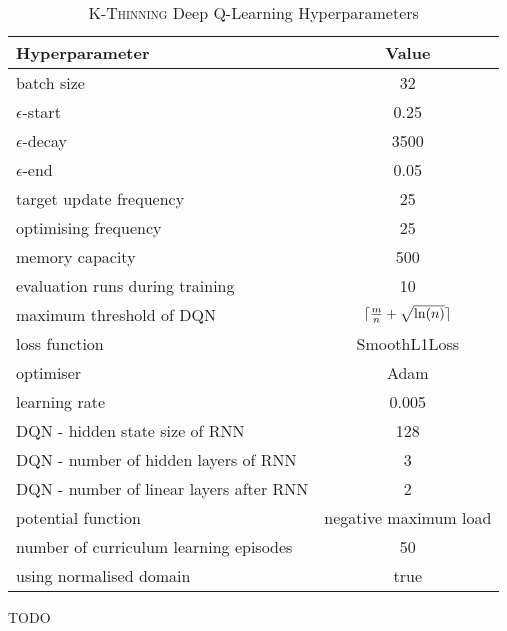 \begin{table}[h!]\label{tab:k-thinning-hyperparameters}
\begin{threeparttable}
\caption{\textsc{K-Thinning} Deep Q-Learning Hyperparameters}
\centering
\begin{tabular}{l|c}
\toprule
Hyperparameter             &     Value \\
\midrule
batch size               &     32 \\ 
$\epsilon$-start               &    0.25 \\ 
$\epsilon$-decay         &     3500\\
$\epsilon$-end              &     0.05 \\
target update frequency               &     25 \\ 
optimising frequency          &     25 \\ 
memory capacity     &     500 \\
evaluation runs during training             &     10 \\
maximum threshold of DQN             &     $\lceil\frac{m}{n}+\sqrt{\ln(n)}\rceil$ \\ 
loss function               &     SmoothL1Loss \\ 
optimiser        &     Adam \\
learning rate             &     0.005 \\
DQN - hidden state size of RNN               &     128 \\ 
DQN - number of hidden layers of RNN         &     3 \\ 
DQN - number of linear layers after RNN     &     2 \\
potential function            &    negative maximum load \\
number of curriculum learning episodes            & 50 \\ 
using normalised domain               &     true \\ 
\bottomrule
\end{tabular}
\begin{tablenotes}
      \small
      \item TODO
\end{tablenotes}
\end{threeparttable}
\end{table}




